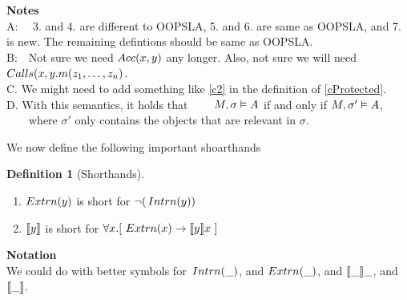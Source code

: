 \documentclass[11pt]{article} %
\theoremstyle{definition}
\newtheorem{definition}{Definition}[section]
\begin{document}
\noindent
\textbf{Notes} 
\\
A: \ \ 3. and 4. are different to OOPSLA, 5. and 6. are same as OOPSLA, and 7. is new. The remaining defintions should be same as OOPSLA.
\\
B:\ \  Not sure we need ${Acc(x,y)}$ any longer. 
 Also, not sure we will need ${Calls(x,y.m (z_1, \ldots, z_n)}$. 
\\
C. We might need to add something like \ref{c2}  in the definition of \ref{cProtected}.
\\
 D. With this semantics, it holds that \ \ \ \ $M , \sigma \vDash A$ if and only if $M , \sigma' \vDash A$, \ \ \ \ where $\sigma'$ only contains the objects that are relevant in $\sigma$.
 

 We now define the following  important shoarthands
 \begin{definition}[Shorthands]
 ~
 
\begin{enumerate}
\item
$Extrn(y)$ is short for  $\neg(\,Intrn(y))$
\item
${\llbracket y \rrbracket}$  is short for ${\forall x.[\ Extrn(x)  \rightarrow  {}{\ensuremath{\llbracket y \rrbracket x}}\ ]}$
\end{enumerate}
\end{definition}
 


 
\noindent
\textbf{Notation} 
\\
We could do with better symbols for $\,Intrn(\_)$, and $Extrn(\_)$, and $\llbracket \_ \rrbracket \_$, and $\llbracket \_ \rrbracket$.
\end{document}
